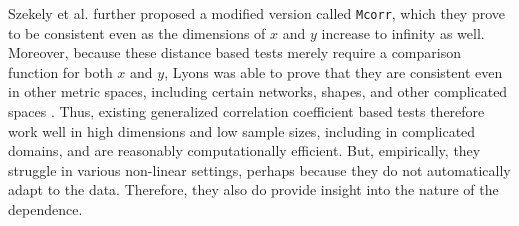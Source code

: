 \documentclass[11pt]{article}
\providecommand{\sct}[1]{{\sc \texttt{#1}}}
\newcommand{\Dcorr}{\sct{Dcorr}}
\newcommand{\Mcorr}{\sct{Mcorr}}
\begin{document}
Szekely et al. \cite{SzekelyRizzo2013a} further proposed a modified version called \Mcorr, which they prove to be consistent even as the dimensions of $x$ and $y$ increase to infinity as well.
Moreover, because these distance based tests merely require a comparison function for both $x$ and $y$, Lyons was able to prove that they are consistent even in other metric spaces, including certain networks, shapes, and other complicated spaces \cite{Lyons2013}.
Thus, existing generalized correlation coefficient based tests therefore
work well in high dimensions and low sample sizes, including in complicated domains, and are reasonably computationally efficient. But, empirically, they struggle in various non-linear settings, perhaps because they do not automatically adapt to the data.  Therefore, they also do provide insight into the nature of the dependence.


\end{document}
